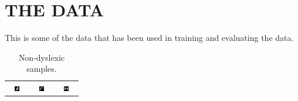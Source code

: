 \chapter{THE DATA}
\label{app:data}

This is some of the data that has been used in training and evaluating the data.

\begin{table}[htbp]
    \centering
    \begin{tabular}{ccc}
        \includegraphics[width=0.3\textwidth]{./appendices/images/A-1.png} & \includegraphics[width=0.3\textwidth]{./appendices/images/F-622.png} & \includegraphics[width=0.3\textwidth]{./appendices/images/N-1585.png} \\
    \end{tabular}
    \caption{Non-dyslexic samples.}
    \label{fig:non-dys}
\end{table}

